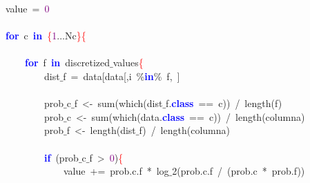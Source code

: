 \mbox{}\ \ \ \ \ \ \ \ value\ \textcolor{BrickRed}{=}\ \textcolor{Purple}{0} \\
\mbox{} \\
\mbox{}\ \ \ \ \ \ \ \ \textbf{\textcolor{Blue}{for}}\ c\ \textbf{\textcolor{Blue}{in}}\ \textcolor{Red}{\{}\textcolor{Purple}{1}\textcolor{BrickRed}{...}Nc\textcolor{Red}{\}\{} \\
\mbox{} \\
\mbox{}\ \ \ \ \ \ \ \ \ \ \ \ \textbf{\textcolor{Blue}{for}}\ f\ \textbf{\textcolor{Blue}{in}}\ discretized$\_$values\textcolor{Red}{\{} \\
\mbox{}\ \ \ \ \ \ \ \ \ \ \ \ \ \ \ \ dist$\_$f\ \textcolor{BrickRed}{=}\ data\textcolor{BrickRed}{[}data\textcolor{BrickRed}{[,}i\ \textcolor{BrickRed}{\%}\textbf{\textcolor{Blue}{in}}\textcolor{BrickRed}{\%}\ f\textcolor{BrickRed}{,}\ \textcolor{BrickRed}{]} \\
\mbox{} \\
\mbox{}\ \ \ \ \ \ \ \ \ \ \ \ \ \ \ \ prob$\_$c$\_$f\ \textcolor{BrickRed}{\textless{}-}\ sum\textcolor{BrickRed}{(}which\textcolor{BrickRed}{(}dist$\_$f\textcolor{BrickRed}{.}\textbf{\textcolor{Blue}{class}}\ \textcolor{BrickRed}{==}\ c\textcolor{BrickRed}{))}\ \textcolor{BrickRed}{/}\ length\textcolor{BrickRed}{(}f\textcolor{BrickRed}{)} \\
\mbox{}\ \ \ \ \ \ \ \ \ \ \ \ \ \ \ \ prob$\_$c\ \textcolor{BrickRed}{\textless{}-}\ sum\textcolor{BrickRed}{(}which\textcolor{BrickRed}{(}data\textcolor{BrickRed}{.}\textbf{\textcolor{Blue}{class}}\ \textcolor{BrickRed}{==}\ c\textcolor{BrickRed}{))}\ \textcolor{BrickRed}{/}\ length\textcolor{BrickRed}{(}columna\textcolor{BrickRed}{)} \\
\mbox{}\ \ \ \ \ \ \ \ \ \ \ \ \ \ \ \ prob$\_$f\ \textcolor{BrickRed}{\textless{}-}\ length\textcolor{BrickRed}{(}dist$\_$f\textcolor{BrickRed}{)}\ \textcolor{BrickRed}{/}\ length\textcolor{BrickRed}{(}columna\textcolor{BrickRed}{)} \\
\mbox{} \\
\mbox{}\ \ \ \ \ \ \ \ \ \ \ \ \ \ \ \ \textbf{\textcolor{Blue}{if}}\ \textcolor{BrickRed}{(}prob$\_$c$\_$f\ \textcolor{BrickRed}{\textgreater{}}\ \textcolor{Purple}{0}\textcolor{BrickRed}{)}\textcolor{Red}{\{} \\
\mbox{}\ \ \ \ \ \ \ \ \ \ \ \ \ \ \ \ \ \ \ \ value\ \textcolor{BrickRed}{+=}\ prob\textcolor{BrickRed}{.}c\textcolor{BrickRed}{.}f\ \textcolor{BrickRed}{*}\ log$\_$2\textcolor{BrickRed}{(}prob\textcolor{BrickRed}{.}c\textcolor{BrickRed}{.}f\ \textcolor{BrickRed}{/}\ \textcolor{BrickRed}{(}prob\textcolor{BrickRed}{.}c\ \textcolor{BrickRed}{*}\ prob\textcolor{BrickRed}{.}f\textcolor{BrickRed}{))} \\

